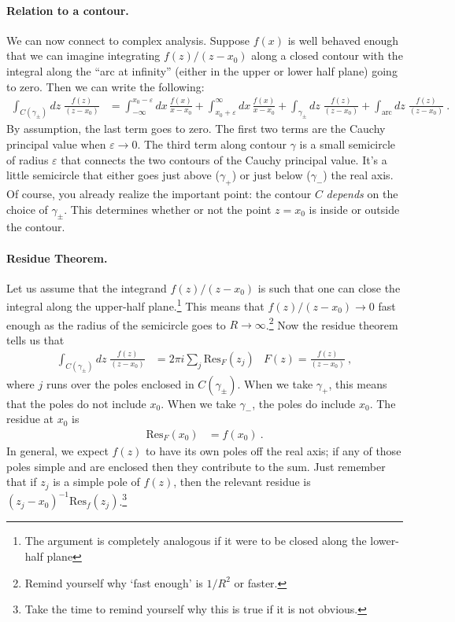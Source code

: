
\paragraph{Relation to a contour.} We can now connect to complex analysis. Suppose $f(x)$ is well behaved enough that we can imagine integrating $f(z)/(z-x_0)$ along a closed contour with the integral along the ``arc at infinity'' (either in the upper or lower half plane) going to zero. Then we can write the following:
\begin{align}
	\int_{C(\gamma_\pm)} dz \; \frac{f(z)}{(z-x_0)} &= 
	\int_{-\infty}^{x_0-\varepsilon} dx\, \frac{f(x)}{x-x_0}
	+
	\int_{x_0+\varepsilon}^\infty dx\, \frac{f(x)}{x-x_0}
	+
	\int_{\gamma_\pm} dz \; \frac{f(z)}{(z-x_0)}
	+
	\int_{\text{arc}} dz \; \frac{f(z)}{(z-x_0)} \ .
	\label{eq:cauchy:contour}
\end{align}
By assumption, the last term goes to zero. The first two terms are the Cauchy principal value when $\varepsilon\to 0$. The third term along contour $\gamma$ is a small semicircle of radius $\varepsilon$ that connects the two contours of the Cauchy principal value. It's a little semicircle that either goes just above ($\gamma_+$) or just below ($\gamma_-$) the real axis. Of course, you already realize the important point: the contour $C$ \emph{depends} on the choice of $\gamma_\pm$. This determines whether or not the point $z=x_0$ is inside or outside the contour.

\paragraph{Residue Theorem.} Let us assume that the integrand $f(z)/(z-x_0)$ is such that one can close the integral along the upper-half plane.\footnote{The argument is completely analogous if it were to be closed along the lower-half plane} This means that $f(z)/(z-x_0) \to 0$ fast enough as the radius of the semicircle goes to $R\to \infty$.\footnote{Remind yourself why `fast enough' is $1/R^2$ or faster.} Now the residue theorem tells us that
\begin{align}
	\int_{C(\gamma_\pm)} dz \; \frac{f(z)}{(z-x_0)} &= 2\pi i \sum_j \text{Res}_F(z_j)
	&
	F(z) = \frac{f(z)}{(z-x_0)} \ ,
\end{align}
where $j$ runs over the poles enclosed in $C(\gamma_\pm)$. When we take $\gamma_+$, this means that the poles do not include $x_0$. When we take $\gamma_-$, the poles do include $x_0$. The residue at $x_0$ is
\begin{align}
 	\text{Res}_F(x_0) &= f(x_0) \ .
\end{align}
In general, we expect $f(z)$ to have its own poles off the real axis; if any of those poles simple and are enclosed then they contribute to the sum. Just remember that if $z_j$ is a simple pole of $f(z)$, then the relevant residue is $(z_j-x_0)^{-1}\text{Res}_f(z_j)$.\footnote{Take the time to remind yourself why this is true if it is not obvious.}

